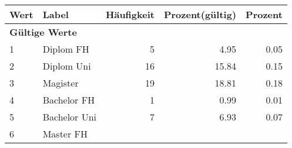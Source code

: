      \begin{longtable}{lXrrr}
     \toprule
     \textbf{Wert} & \textbf{Label} & \textbf{Häufigkeit} & \textbf{Prozent(gültig)} & \textbf{Prozent} \\
     \endhead
     \midrule
     \multicolumn{5}{l}{\textbf{Gültige Werte}}\\

     1 &
     \multicolumn{1}{X}{ Diplom FH   } &


       \num{5} &
       \num[round-mode=places,round-precision=2]{4.95} &
         \num[round-mode=places,round-precision=2]{0.05} \\

     2 &
     \multicolumn{1}{X}{ Diplom Uni   } &


       \num{16} &
       \num[round-mode=places,round-precision=2]{15.84} &
         \num[round-mode=places,round-precision=2]{0.15} \\

     3 &
     \multicolumn{1}{X}{ Magister   } &


       \num{19} &
       \num[round-mode=places,round-precision=2]{18.81} &
         \num[round-mode=places,round-precision=2]{0.18} \\

     4 &
     \multicolumn{1}{X}{ Bachelor FH   } &


       \num{1} &
       \num[round-mode=places,round-precision=2]{0.99} &
         \num[round-mode=places,round-precision=2]{0.01} \\

     5 &
     \multicolumn{1}{X}{ Bachelor Uni   } &


       \num{7} &
       \num[round-mode=places,round-precision=2]{6.93} &
         \num[round-mode=places,round-precision=2]{0.07} \\

     6 &
     \multicolumn{1}{X}{ Master FH   } &



\end{longtable}
